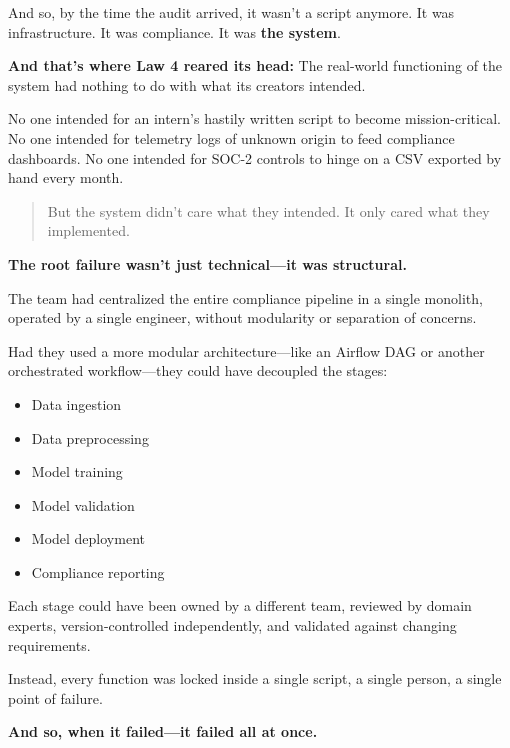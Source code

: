     And so, by the time the audit arrived, it wasn’t a script anymore.  
    It was infrastructure.  
    It was compliance.  
    It was \textbf{the system}.
    
    \medskip
    
    \textbf{And that’s where Law 4 reared its head:}  
    The real-world functioning of the system had nothing to do with what its creators intended.
    
    No one intended for an intern’s hastily written script to become mission-critical.  
    No one intended for telemetry logs of unknown origin to feed compliance dashboards.  
    No one intended for SOC-2 controls to hinge on a CSV exported by hand every month.
    
    \begin{quote}
    But the system didn’t care what they intended.
    It only cared what they implemented.
    \end{quote}
    
    \medskip
    
    \textbf{The root failure wasn’t just technical—it was structural.}
    
    The team had centralized the entire compliance pipeline in a single monolith, operated by a single engineer, without modularity or separation of concerns.
    
    Had they used a more modular architecture—like an Airflow DAG or another orchestrated workflow—they could have decoupled the stages:
    
    \begin{itemize}
        \item Data ingestion
        \item Data preprocessing
        \item Model training
        \item Model validation
        \item Model deployment
        \item Compliance reporting
    \end{itemize}
    
    Each stage could have been owned by a different team, reviewed by domain experts, version-controlled independently, and validated against changing requirements.
    
    Instead, every function was locked inside a single script, a single person, a single point of failure.
    
    \medskip
    
    \textbf{And so, when it failed—it failed all at once.}
    
